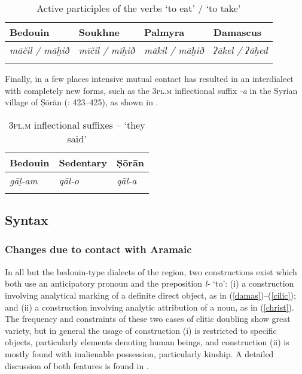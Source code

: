 \documentclass[output=paper]{langsci/langscibook}
\begin{document}
\begin{table}
\begin{tabularx}{.8\textwidth}{lllX}
\lsptoprule
 Bedouin &   Soukhne &  Palmyra &  Damascus\\
 \midrule 
\textit{māčil / māḫið} & \textit{mīčil / mīḫið} & \textit{mākil / māḫið} & \textit{ʔākel / ʔāḫed}\\
\lspbottomrule
\end{tabularx}
\caption{Active participles of the verbs ‘to eat’ / ‘to take’}
\label{tab:prochazka:3}
\end{table}

Finally, in a few places intensive mutual contact has resulted in an interdialect \citep[62]{Trudgill1986} with completely new forms, such as the 3\textsc{pl.m} inflectional suffix \textit{-a} in the Syrian village of Ṣōrān (\citealt{Behnstedt1994Dialektkontakt}: 423--425), as shown in .

\begin{table}
\begin{tabularx}{.8\textwidth}{XXl}
\lsptoprule
 Bedouin &  Sedentary &  Ṣōrān\\
\midrule 
\textit{gāḷ-am} & \textit{qāl-o} & \textit{qāl-a}\\
\lspbottomrule
\end{tabularx}
\caption{3\textsc{pl.m} inflectional suffixes -- `they said'}  
\label{tab:prochazka:4}
\end{table}

  \subsection{Syntax}
  \subsubsection{Changes due to contact with Aramaic}

In all but the bedouin-type dialects of the region, two constructions exist which both use an anticipatory pronoun and the preposition \textit{l-} ‘to’: (i) a construction involving analytical marking of a definite direct object, as in (\ref{damas})--(\ref{cilic}); and (ii) a construction involving analytic attribution of a noun, as in (\ref{christ}). The frequency and constraints of these two cases of clitic doubling show great variety, but in general the usage of construction (i) is restricted to specific objects, particularly elements denoting human beings, and construction (ii) is mostly found with inalienable possession, particularly kinship. A detailed discussion of both features is found in \citet{Souag2017clitic}.
\end{document}
